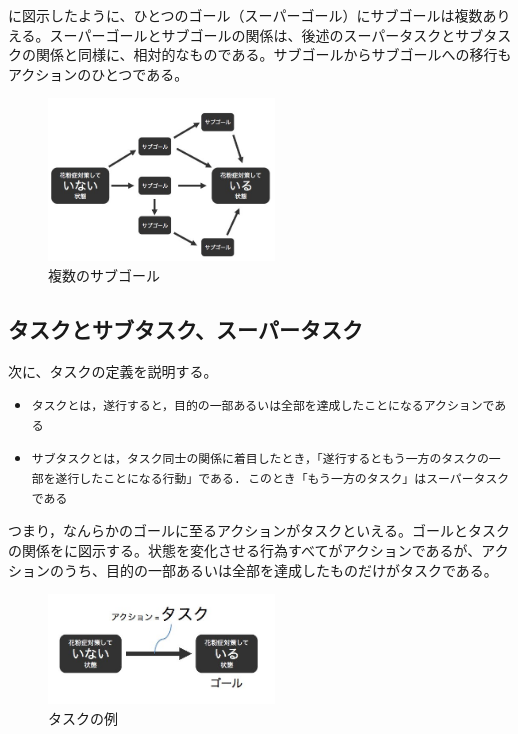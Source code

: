 \documentclass[submit,techreq]{ipsj}
\def\|{\verb|}
\begin{document}
に図示したように、ひとつのゴール（スーパーゴール）にサブゴールは複数ありえる。スーパーゴールとサブゴールの関係は、後述のスーパータスクとサブタスクの関係と同様に、相対的なものである。サブゴールからサブゴールへの移行もアクションのひとつである。



\begin{figure}[tb]
\includegraphics[width=6cm, bb=0 0 450 400]{many_sub_goals.jpg}
\caption{複数のサブゴール}
\label{fig:many_sub_goals}
\end{figure}



%3.2
\subsection{タスクとサブタスク、スーパータスク}


次に、タスクの定義を説明する。

\begin{itemize}

\item \|タスクとは，遂行すると，目的の一部あるいは全部を達成したことになるアクションである|
\item \|サブタスクとは，タスク同士の関係に着目したとき，「遂行するともう一方のタスクの一部を遂行したことになる行動」である. このとき「もう一方のタスク」はスーパータスクである|
\end{itemize}

つまり，なんらかのゴールに至るアクションがタスクといえる。ゴールとタスクの関係をに図示する。状態を変化させる行為すべてがアクションであるが、アクションのうち、目的の一部あるいは全部を達成したものだけがタスクである。


\begin{figure}[tb]
\includegraphics[width=6cm, bb=0 0 400 300]{action_task.jpg}
\caption{タスクの例}
\label{fig:action_task}
\end{figure}
\end{document}
